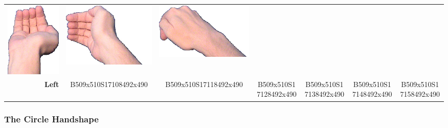 \documentclass{article}
\begin{document}
\begin{center}
\begin{tabular}{r*{6}{c}}
\includegraphics[scale=0.1]{images/05-16-4.jpg}&
\includegraphics[scale=0.1]{images/05-16-5.jpg}&
\includegraphics[scale=0.1]{images/05-16-6.jpg}\\
\textbf{Left}&
B509x510S17108492x490&
B509x510S17118492x490&
B509x510S17128492x490&
B509x510S17138492x490&
B509x510S17148492x490&
B509x510S17158492x490\\
\end{tabular}
\end{center}

\subsubsection{The Circle Handshape}
\end{document}
